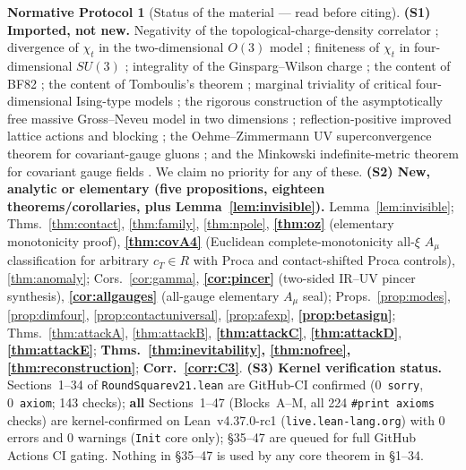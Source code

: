\documentclass[11pt,a4paper]{article}
\def\R{R}\def\N{N}\def\Q{Q}\def\Z{Z}\def\Class{C}\def\OS{OS}\def\Gap{Gap}%
\theoremstyle{plain}
\theoremstyle{definition}
\newtheorem{protocol}[theorem]{Normative Protocol}
\theoremstyle{remark}
\newcommand{\R}{\mathbb{R}}\newcommand{\N}{\mathbb{N}}\newcommand{\Q}{\mathbb{Q}}
\newcommand{\Z}{\mathbb{Z}}\newcommand{\Spec}{\operatorname{Spec}}
\newcommand{\OS}{\mathrm{OS}}\newcommand{\Gap}{\mathrm{Gap}}
\newcommand{\Class}{\mathcal{C}}\newcommand{\Htot}{\mathcal{H}}
\newcommand{\Chit}{\chi_t}
\renewcommand{\_}{\oldunderscore\allowbreak}
\begin{document}
\begin{protocol}[Status of the material --- read before citing]\label{prot:newstatus}
\textbf{(S1) Imported, not new.} Negativity of the topological-charge-density correlator
\cite{Horvath2005,Vicari1999,Chowdhury2015,Cheng2025}; divergence of $\Chit$ in the
two-dimensional $O(3)$ model \cite{Bietenholz2018,Thomas2021}; finiteness of $\Chit$ in
four-dimensional $SU(3)$ \cite{Ce2015}; integrality of the Ginsparg--Wilson charge
\cite{Schierholz2024}; the content of BF82 \cite{BF1982}; the content of Tomboulis's theorem
\cite{Tomboulis1983,Tomboulis2007}; marginal triviality of critical four-dimensional Ising-type
models \cite{ADC2021,ADC2024}; the rigorous construction of the asymptotically free massive
Gross--Neveu model in two dimensions \cite{FMRS1986,GK1985}; reflection-positive improved
lattice actions and blocking \cite{LuscherWeisz1985,Symanzik1985}; the Oehme--Zimmermann
UV superconvergence theorem for covariant-gauge gluons \cite{OehmeZimmermann1980}; and the Minkowski indefinite-metric theorem for covariant gauge fields \cite{KugoOjima1979,StrocchiBook}. We claim no
priority for any of these.
\textbf{(S2) New, analytic or elementary (five propositions, eighteen theorems/corollaries, plus Lemma~\ref{lem:invisible}).}
Lemma~\ref{lem:invisible};
Thms.~\ref{thm:contact}, \ref{thm:family}, \ref{thm:npole}, \textbf{\ref{thm:oz}} (elementary monotonicity proof), \textbf{\ref{thm:covA4}} (Euclidean complete-monotonicity all-$\xi$ $A_\mu$ classification for arbitrary $c_T\in\R$ with Proca and contact-shifted Proca controls), \ref{thm:anomaly};
Cors.~\ref{cor:gamma}, \textbf{\ref{cor:pincer}} (two-sided IR--UV pincer synthesis), \textbf{\ref{cor:allgauges}} (all-gauge elementary $A_\mu$ seal); Props.~\ref{prop:modes}, \ref{prop:dimfour}, \ref{prop:contactuniversal},
\ref{prop:afexp}, \textbf{\ref{prop:betasign}};
Thms.~\ref{thm:attackA}, \ref{thm:attackB}, \textbf{\ref{thm:attackC}},
\textbf{\ref{thm:attackD}}, \textbf{\ref{thm:attackE}};
\textbf{Thms.~\ref{thm:inevitability}, \ref{thm:nofree}, \ref{thm:reconstruction}};
\textbf{Corr.~\ref{corr:C3}}.
\textbf{(S3) Kernel verification status.} Sections~1--34 of \texttt{RoundSquare\_v21.lean} are GitHub-CI confirmed (0~\texttt{sorry}, 0~\texttt{axiom}; 143 checks); \textbf{all} Sections~1--47 (Blocks~A--M, all 224 \texttt{\#print axioms} checks) are kernel-confirmed on Lean~v4.37.0-rc1 (\texttt{live.lean-lang.org}) with 0 errors and 0 warnings (\texttt{Init} core only); \S35--47 are queued for full GitHub Actions CI gating. Nothing in \S35--47 is used by any core theorem in \S1--34.
\end{protocol}
\end{document}
